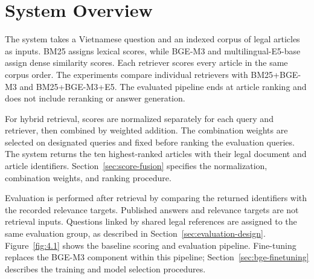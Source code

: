 \section{System Overview}
\label{sec:system-overview}

The system takes a Vietnamese question and an indexed corpus of legal articles as inputs. BM25 assigns lexical scores, while BGE-M3 and multilingual-E5-base assign dense similarity scores. Each retriever scores every article in the same corpus order. The experiments compare individual retrievers with BM25+BGE-M3 and BM25+BGE-M3+E5. The evaluated pipeline ends at article ranking and does not include reranking or answer generation.

For hybrid retrieval, scores are normalized separately for each query and retriever, then combined by weighted addition. The combination weights are selected on designated queries and fixed before ranking the evaluation queries. The system returns the ten highest-ranked articles with their legal document and article identifiers. Section~\ref{sec:score-fusion} specifies the normalization, combination weights, and ranking procedure.

Evaluation is performed after retrieval by comparing the returned identifiers with the recorded relevance targets. Published answers and relevance targets are not retrieval inputs. Questions linked by shared legal references are assigned to the same evaluation group, as described in Section~\ref{sec:evaluation-design}. Figure~\ref{fig:4.1} shows the baseline scoring and evaluation pipeline. Fine-tuning replaces the BGE-M3 component within this pipeline; Section~\ref{sec:bge-finetuning} describes the training and model selection procedures.

